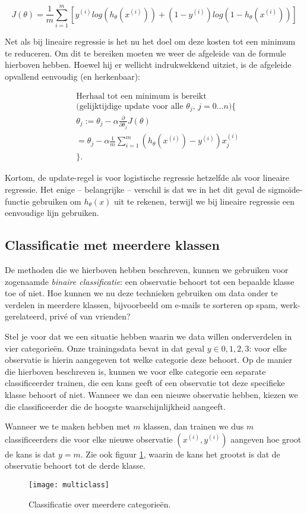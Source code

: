 \[
J(\theta) = \frac{1}{m}\sum_{i=1}^m \left[y^{(i)}log(h_\theta(x^{(i)})) + (1-y^{(i)})log(1-h_\theta(x^{(i)}))\right]
\]

Net als bij lineaire regressie is het nu het doel om deze kosten tot een minimum te reduceren. Om dit te bereiken moeten we weer de afgeleide van de formule hierboven hebben. Hoewel hij er wellicht indrukwekkend uitziet, is de afgeleide opvallend eenvoudig (en herkenbaar):

\[
\begin{aligned}
& \textrm{Herhaal tot een minimum is bereikt}\\
& \textrm{(gelijktijdige update voor alle $\theta_j$, $j=0 \hdots n$)}\{\\
& \theta_j := \theta_j - \alpha \frac{\partial}{{\partial}{\theta_j}}J(\theta) \\
& = \theta_j - \alpha \frac{1}{m}\sum_{i=1}^{m} (h_\theta(x^{(i)}) - y^{(i)})x_j^{(i)}\\
&\}.
\end{aligned}
\]

Kortom, de update-regel is voor logistische regressie hetzelfde als voor lineaire regressie. Het enige – belangrijke – verschil is dat we in het dit geval de sigmoïde-functie gebruiken om $h_\theta(x)$ uit te rekenen, terwijl we bij lineaire regressie een eenvoudige lijn gebruiken.

\subsection{Classificatie met meerdere klassen}
De methoden die we hierboven hebben beschreven, kunnen we gebruiken voor zogenaamde \textit{binaire classificatie}: een observatie behoort tot een bepaalde klasse toe of niet. Hoe kunnen we nu deze technieken gebruiken om data onder te verdelen in meerdere klassen, bijvoorbeeld om e-mails te sorteren op spam, werk-gerelateerd, privé of van vrienden? 

Stel je voor dat we een situatie hebben waarin we data willen onderverdelen in vier categorieën. Onze trainingsdata bevat in dat geval $y\in{0,1,2,3}$: voor elke observatie is hierin aangegeven tot welke categorie deze behoort. Op de manier die hierboven beschreven is, kunnen we voor elke categorie een separate classificeerder trainen, die een kans geeft of een observatie tot deze specifieke klasse behoort of niet. Wanneer we dan een nieuwe observatie hebben, kiezen we die classificeerder die de hoogste waarschijnlijkheid aangeeft.

Wanneer we te maken hebben met $m$ klassen, dan trainen we dus $m$ classificeerders die voor elke nieuwe observatie $(x^{(i)}, y^{(i)})$ aangeven hoe groot de kans is dat $y=m$. Zie ook figuur \ref{img:multiclass}, waarin de kans het grootst is dat de observatie behoort tot de derde klasse.

\begin{figure}[h]
\centering
\texttt{[image: multiclass]}
\caption{Classificatie over meerdere categorieën.\label{img:multiclass}}
\end{figure}

